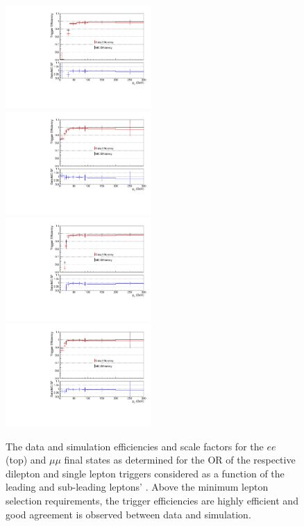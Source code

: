 \begin{figure}[htbp]
\centering
\includegraphics[width=0.495\textwidth]{figs/background-estimation/triggerEfficiency/ttbar/electron1_pT_SF_alt.pdf}
\includegraphics[width=0.495\textwidth]{figs/background-estimation/triggerEfficiency/ttbar/electron2_pT_SF_alt.pdf}
\\
\includegraphics[width=0.495\textwidth]{figs/background-estimation/triggerEfficiency/ttbar/muon1_pT_SF_alt.pdf}
\includegraphics[width=0.495\textwidth]{figs/background-estimation/triggerEfficiency/ttbar/muon2_pT_SF_alt.pdf}
\caption{
The data and \ttbar simulation efficiencies and scale factors for the $ee$ (top) and $\mu\mu$ final states as determined for the OR of the respective dilepton and single lepton triggers considered as a function of the leading and sub-leading leptons' \pT. Above the minimum lepton selection \pT requirements, the trigger efficiencies are highly efficient and good agreement is observed between data and simulation.
}
\label{fig:trig_pT_SF}
\end{figure}

